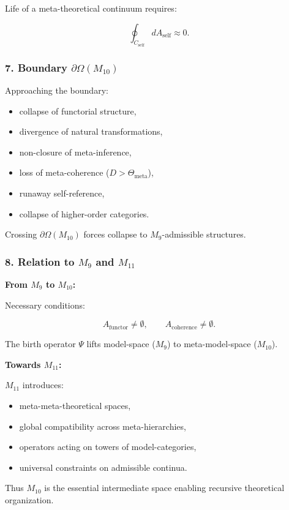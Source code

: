 Life of a meta-theoretical continuum requires:

\[
\oint_{C_{\mathrm{self}}} dA_{\mathrm{self}} \approx 0.
\]

\subsubsection*{7. Boundary $\partial\Omega(M_{10})$}

Approaching the boundary:

\begin{itemize}
    \item collapse of functorial structure,
    \item divergence of natural transformations,
    \item non-closure of meta-inference,
    \item loss of meta-coherence ($D>\Theta_{\mathrm{meta}}$),
    \item runaway self-reference,
    \item collapse of higher-order categories.
\end{itemize}

Crossing $\partial\Omega(M_{10})$ forces collapse to $M_9$-admissible structures.

\subsubsection*{8. Relation to \texorpdfstring{$M_9$}{M_9} and $M_{11}$}

\textbf{From $M_9$ to $M_{10}$:}

Necessary conditions:

\[
A_{\mathrm{functor}}\neq\emptyset,\qquad
A_{\mathrm{coherence}}\neq\emptyset.
\]

The birth operator $\Psi$ lifts model-space ($M_9$) to meta-model-space ($M_{10}$).

\textbf{Towards $M_{11}$:}

$M_{11}$ introduces:

\begin{itemize}
    \item meta-meta-theoretical spaces,
    \item global compatibility across meta-hierarchies,
    \item operators acting on towers of model-categories,
    \item universal constraints on admissible continua.
\end{itemize}

Thus $M_{10}$ is the essential intermediate space enabling 
recursive theoretical organization.
